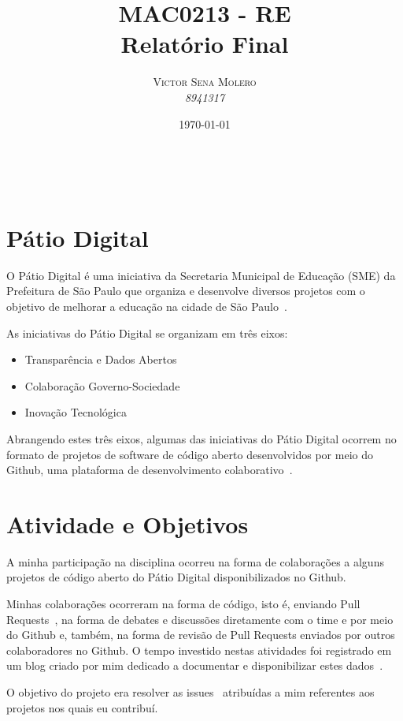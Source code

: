 \documentclass[a4paper, 11pt]{article} %
\title{\textbf{MAC0213 - RE}\\ %
Relatório Final} %
\author{\textsc{Victor Sena Molero} %
\\{\textit{8941317}}} %
\date{\today} %
\makeatletter
\renewcommand{\maketitle}{ %
\begin{flushright} %
{\LARGE\@title} %

\vspace{50pt} %

{\large\@author} %
\\\@date %

\vspace{40pt} %
\end{flushright}
}
\makeatother
\begin{document}
\maketitle %


\section*{Pátio Digital}
O Pátio Digital é uma iniciativa da Secretaria Municipal de Educação (SME) da Prefeitura de São Paulo que organiza e desenvolve diversos projetos com o objetivo de melhorar a educação na cidade de São Paulo~\cite{Patio}.

As iniciativas do Pátio Digital se organizam em três eixos:

\begin{itemize}
    \item Transparência e Dados Abertos
    \item Colaboração Governo-Sociedade
    \item Inovação Tecnológica
\end{itemize}

Abrangendo estes três eixos, algumas das iniciativas do Pátio Digital ocorrem no formato de projetos de software de código aberto desenvolvidos por meio do Github, uma plataforma de desenvolvimento colaborativo~\cite{Github}.


\section*{Atividade e Objetivos}
A minha participação na disciplina ocorreu na forma de colaborações a alguns projetos de código aberto do Pátio Digital disponibilizados no Github.

Minhas colaborações ocorreram na forma de código, isto é, enviando Pull Requests~\cite{PR}, na forma de debates e discussões diretamente com o time e por meio do Github e, também, na forma de revisão de Pull Requests enviados por outros colaboradores no Github.  O tempo investido nestas atividades foi registrado em um blog criado por mim dedicado a documentar e disponibilizar estes dados~\cite{Blog}.

O objetivo do projeto era resolver as issues~\cite{Issue} atribuídas a mim referentes aos projetos nos quais eu contribuí.
\end{document}
